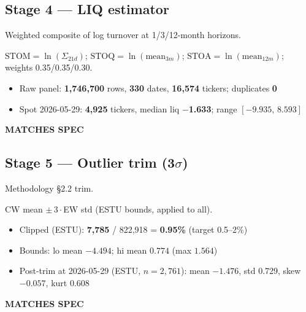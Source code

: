 \documentclass[11pt,a4paper]{article}
\newcommand{\PASS}[1]{\textcolor{pass}{\textbf{#1}}}
\begin{document}
\subsection{Stage 4 --- LIQ estimator}

\begin{description}[style=nextline]
  \item[PDF SPEC] Weighted composite of log turnover at 1/3/12-month horizons.
  \item[Implementation] $\mathrm{STOM}=\ln(\Sigma_{21d})$; $\mathrm{STOQ}=\ln(\text{mean}_{3m})$; $\mathrm{STOA}=\ln(\text{mean}_{12m})$; weights 0.35/0.35/0.30.
  \item[Observed]\phantom{x}
    \begin{itemize}[nosep, topsep=-\parskip]
      \item Raw panel: \textbf{1{,}746{,}700} rows, \textbf{330} dates, \textbf{16{,}574} tickers; duplicates \textbf{0}
      \item Spot 2026-05-29: \textbf{4{,}925} tickers, median liq \textbf{$-$1.633}; range $[-9.935,\,8.593]$
    \end{itemize}
  \item[Status] \PASS{MATCHES SPEC}
\end{description}

\subsection{Stage 5 --- Outlier trim (3$\sigma$)}

\begin{description}[style=nextline]
  \item[PDF SPEC] Methodology \S2.2 trim.
  \item[Implementation] CW mean $\pm\,3\cdot$EW std (ESTU bounds, applied to all).
  \item[Observed]\phantom{x}
    \begin{itemize}[nosep, topsep=-\parskip]
      \item Clipped (ESTU): \textbf{7{,}785} / 822{,}918 = \textbf{0.95\%} (target 0.5--2\%)
      \item Bounds: lo mean $-4.494$; hi mean $0.774$ (max $1.564$)
      \item Post-trim at 2026-05-29 (ESTU, $n=2{,}761$): mean $-1.476$, std 0.729, skew $-0.057$, kurt 0.608
    \end{itemize}
  \item[Status] \PASS{MATCHES SPEC}
\end{description}
\end{document}
